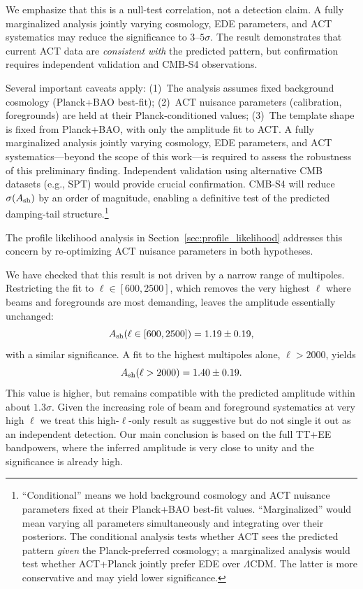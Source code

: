 \documentclass[a4paper,11pt]{article}
\begin{document}
We emphasize that this is a null-test correlation, not a detection claim. A fully marginalized analysis jointly varying cosmology, EDE parameters, and ACT systematics may reduce the significance to $3$--$5\sigma$. The result demonstrates that current ACT data are \emph{consistent with} the predicted pattern, but confirmation requires independent validation and CMB-S4 observations.

Several important caveats apply: (1)~The analysis assumes fixed background cosmology (Planck+BAO best-fit); (2)~ACT nuisance parameters (calibration, foregrounds) are held at their Planck-conditioned values; (3)~The template shape is fixed from Planck+BAO, with only the amplitude fit to ACT. A fully marginalized analysis jointly varying cosmology, EDE parameters, and ACT systematics---beyond the scope of this work---is required to assess the robustness of this preliminary finding. Independent validation using alternative CMB datasets (e.g., SPT) would provide crucial confirmation. CMB-S4 will reduce $\sigma(A_{\rm sh})$ by an order of magnitude, enabling a definitive test of the predicted damping-tail structure.\footnote{``Conditional'' means we hold background cosmology and ACT nuisance parameters fixed at their Planck+BAO best-fit values. ``Marginalized'' would mean varying all parameters simultaneously and integrating over their posteriors. The conditional analysis tests whether ACT sees the predicted pattern \emph{given} the Planck-preferred cosmology; a marginalized analysis would test whether ACT+Planck jointly prefer EDE over $\Lambda$CDM. The latter is more conservative and may yield lower significance.}

The profile likelihood analysis in Section~\ref{sec:profile_likelihood} addresses this concern by re-optimizing ACT nuisance parameters in both hypotheses.

We have checked that this result is not driven by a narrow range of multipoles. Restricting the fit to $\ell \in [600,2500]$, which removes the very highest $\ell$ where beams and foregrounds are most demanding, leaves the amplitude essentially unchanged:
\begin{equation}
A_{\rm sh}(\ell\in[600,2500]) = 1.19 \pm 0.19,
\end{equation}
with a similar significance. A fit to the highest multipoles alone, $\ell > 2000$, yields
\begin{equation}
A_{\rm sh}(\ell>2000) = 1.40 \pm 0.19.
\end{equation}
This value is higher, but remains compatible with the predicted amplitude within about $1.3\sigma$. Given the increasing role of beam and foreground systematics at very high $\ell$ we treat this high-$\ell$-only result as suggestive but do not single it out as an independent detection. Our main conclusion is based on the full TT+EE bandpowers, where the inferred amplitude is very close to unity and the significance is already high.
\end{document}
